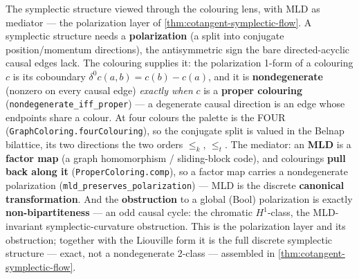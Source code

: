 \begin{theorem}\label{thm:causal-polarization}\leanok{}
The symplectic structure viewed through the colouring lens, with MLD as mediator --- the
polarization layer of \cref{thm:cotangent-symplectic-flow}. A symplectic structure needs a
\textbf{polarization} (a split into conjugate position/momentum directions), the antisymmetric sign
the bare directed-acyclic causal edges lack. The colouring supplies it: the polarization 1-form of a
colouring $c$ is its coboundary $\delta^0 c(a,b) = c(b) - c(a)$, and it is \textbf{nondegenerate}
(nonzero on every causal edge) \emph{exactly when} $c$ is a \textbf{proper colouring}
(\texttt{nondegenerate\_iff\_proper}) --- a degenerate causal direction is an edge whose endpoints
share a colour. At four colours the palette is the FOUR (\texttt{GraphColoring.fourColouring}), so the
conjugate split is valued in the Belnap bilattice, its two directions the two orders $\leq_k$,
$\leq_t$. The mediator: an \textbf{MLD} is a \textbf{factor map} (a graph homomorphism / sliding-block
code), and colourings \textbf{pull back along it} (\texttt{ProperColoring.comp}), so a factor map
carries a nondegenerate polarization (\texttt{mld\_preserves\_polarization}) --- MLD is the discrete
\textbf{canonical transformation}. And the \textbf{obstruction} to a global (Bool) polarization is
exactly \textbf{non-bipartiteness} --- an odd causal cycle: the chromatic $H^1$-class, the
MLD-invariant symplectic-curvature obstruction. This is the polarization layer and its obstruction;
together with the Liouville form it is the full discrete symplectic structure --- exact, not a
nondegenerate 2-class --- assembled in \cref{thm:cotangent-symplectic-flow}.
\end{theorem}
